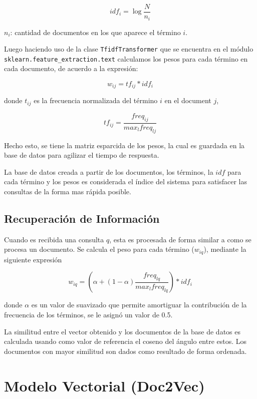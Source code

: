 \documentclass[12pt]{llncs}
\begin{document}
$$idf_i = \log \frac{N}{n_i}$$

$n_i$: cantidad de documentos en los que aparece el término $i$.

Luego haciendo uso de la clase \verb+TfidfTransformer+ que se encuentra en el módulo \verb+sklearn.feature_extraction.text+ calculamos los pesos para cada término en cada documento, de acuerdo a la expresión:

$$w_{ij} = tf_{ij} * idf_i$$

donde $t_{ij}$ es la frecuencia normalizada del término $i$ en el document $j$,

$$tf_{ij} = \frac{freq_{ij}}{max_l freq_{lj}}$$

Hecho esto, se tiene la matriz esparcida de los pesos, la cual es guardada en la base de datos para agilizar el tiempo de respuesta.

La base de datos creada a partir de los documentos, los términos, la $idf$ para cada término y los pesos es considerada el índice del sistema para satisfacer las consultas de la forma mas rápida posible.

\subsection{Recuperación de Información}

Cuando es recibida una consulta $q$, esta es procesada de forma similar a como se procesa un documento. Se calcula el peso para cada término ($w_{iq}$), mediante la siguiente expresión

$$w_{iq} = (\alpha + (1 - \alpha) \frac{freq_{lq}}{max_l freq_{lq}}) * idf_i$$

donde $\alpha$ es un valor de suavizado que permite amortiguar la contribución de la frecuencia de los términos, se le asignó un valor de 0.5.

La similitud entre el vector obtenido y los documentos de la base de datos es calculada usando como valor de referencia el coseno del ángulo entre estos. Los documentos con mayor similitud son dados como resultado de forma ordenada.


\section{Modelo Vectorial (Doc2Vec)}
\end{document}
